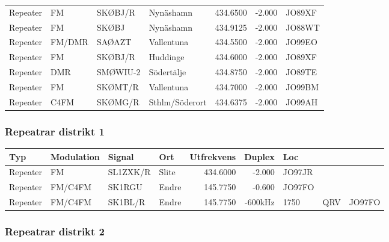 \begin{longtable}{llllrrl}
	Repeater & FM         & SKØBJ/R  & Nynäshamn       &   434.6500 &   -2.000 & JO89XF \\
	Repeater & FM         & SKØBJ    & Nynäshamn       &   434.9125 &   -2.000 & JO88WT \\
	Repeater & FM/DMR     & SAØAZT   & Vallentuna      &   434.5500 &   -2.000 & JO99EO \\
	Repeater & FM         & SKØBJ/R  & Huddinge        &   434.6000 &   -2.000 & JO89XF \\
	Repeater & DMR        & SMØWIU-2 & Södertälje      &   434.8750 &   -2.000 & JO89TE \\
	Repeater & FM         & SKØMT/R  & Vallentuna      &   434.7000 &   -2.000 & JO99BM \\
	Repeater & C4FM       & SKØMG/R  & Sthlm/Söderort  &   434.6375 &   -2.000 & JO99AH
\end{longtable}

\subsubsection{Repeatrar distrikt 1}

\begin{longtable}{llllrrlcl}
	Typ      & Modulation & Signal   & Ort   & Utfrekvens &  Duplex & Loc    &  \\ \hline
	Repeater & FM         & SL1ZXK/R & Slite &   434.6000 &  -2.000 & JO97JR &     &  \\
	Repeater & FM/C4FM    & SK1RGU   & Endre &   145.7750 &  -0.600 & JO97FO &     &  \\
	Repeater & FM/C4FM    & SK1BL/R  & Endre &   145.7750 & -600kHz & 1750   & QRV & JO97FO
\end{longtable}

\subsubsection{Repeatrar distrikt 2}

